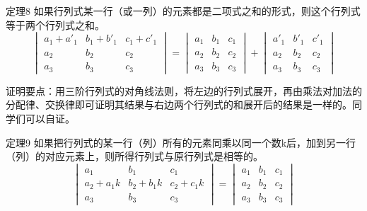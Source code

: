 \begin{blk}{定理8}
如果行列式某一行（或一列）的元素都是二项式之和的形式，则这个行列式等于两个行列式之和。
\[\begin{vmatrix}
    a_1+a'_1&b_1+b'_1&c_1+c'_1\\a_2&b_2&c_2\\a_3&b_3&c_3
\end{vmatrix}=\begin{vmatrix}
    a_1&b_1&c_1\\a_2&b_2&c_2\\a_3&b_3&c_3
\end{vmatrix}+\begin{vmatrix}
    a'_1&b'_1&c'_1\\a_2&b_2&c_2\\a_3&b_3&c_3
\end{vmatrix}\]
\end{blk}

证明要点：用三阶行列式的对角线法则，将左边的行列式展开，再由乘法对加法的分配律、交换律即可证明其结果与右边两个行列式的和展开后的结果是一样的。同学们可以自证。

\begin{blk}{定理9}
    如果把行列式的某一行（列）所有的元素同乘以同一个数k后，加到另一行（列）的对应元素上，则所得行列式与原行列式是相等的。
\[\begin{vmatrix}
    a_1&b_1&c_1\\a_2+a_1k&b_2+b_1k&c_2+c_1k\\a_3&b_3&c_3
\end{vmatrix}=\begin{vmatrix}
    a_1&b_1&c_1\\a_2&b_2&c_2\\a_3&b_3&c_3
\end{vmatrix}\]
\end{blk}

